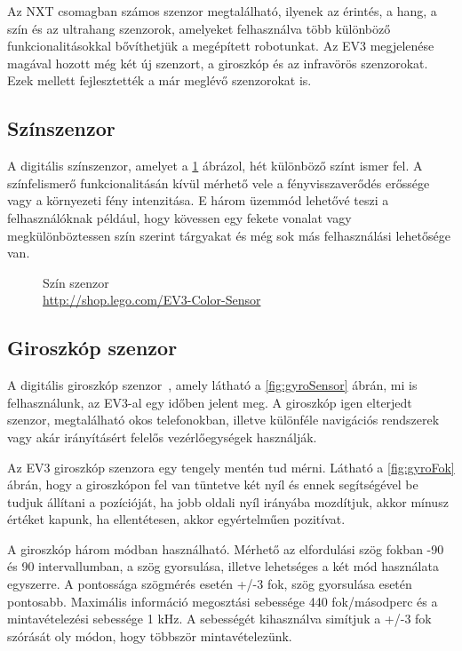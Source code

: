 Az NXT csomagban számos szenzor megtalálható, ilyenek az érintés, a hang, a szín és az ultrahang szenzorok, amelyeket felhasználva több különböző funkcionalitásokkal bővíthetjük a megépített robotunkat. Az EV3 megjelenése magával hozott még két új szenzort, a giroszkóp és az infravörös szenzorokat. Ezek mellett fejlesztették a már meglévő szenzorokat is.

\subsection{Színszenzor}

A digitális színszenzor, amelyet a \ref{fig:colorSensor} ábrázol, hét különböző színt ismer fel. A színfelismerő funkcionalitásán kívül mérhető vele a fényvisszaverődés erőssége vagy a környezeti fény intenzitása. E három üzemmód lehetővé teszi a felhasználóknak például, hogy kövessen egy fekete vonalat vagy megkülönböztessen szín szerint tárgyakat és még sok más felhasználási lehetősége van.

\begin{figure}[!htb]
	\centering
	\caption[Szín szenzor]
	{Szín szenzor\\
	\href{http://shop.lego.com/en-CA/EV3-Color-Sensor-45506}{http://shop.lego.com/EV3-Color-Sensor}}
	\label{fig:colorSensor}
\end{figure}

\subsection{Giroszkóp szenzor}

A digitális giroszkóp szenzor~\cite{sensorMotor}\cite{sensor}, amely látható a \ref{fig:gyroSensor} ábrán, mi is felhasználunk, az EV3-al egy időben jelent meg. A giroszkóp igen elterjedt szenzor, megtalálható okos telefonokban, illetve különféle navigációs rendszerek vagy akár irányításért felelős vezérlőegységek használják. 

Az EV3 giroszkóp szenzora egy tengely mentén tud mérni. Látható a \ref{fig:gyroFok} ábrán, hogy a giroszkópon fel van tüntetve két nyíl és ennek segítségével be tudjuk állítani a pozícióját, ha jobb oldali nyíl irányába mozdítjuk, akkor mínusz értéket kapunk, ha ellentétesen, akkor egyértelműen pozitívat. 

A giroszkóp három módban használható. Mérhető az elfordulási szög fokban -90 és 90 intervallumban, a szög gyorsulása, illetve lehetséges a két mód használata egyszerre. A pontossága szögmérés esetén +/-3 fok, szög gyorsulása esetén pontosabb. Maximális információ megosztási sebessége 440 fok/másodperc és a mintavételezési sebessége 1 kHz. A sebességét kihasználva simítjuk  a +/-3 fok szórását oly módon, hogy többször mintavételezünk.

